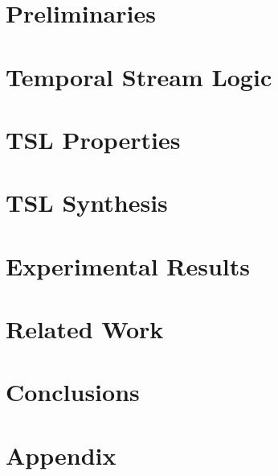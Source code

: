 \documentclass{llncs}
\begin{document}
\section{Preliminaries}
\label{sec:prelim}


\section{Temporal Stream Logic}
\label{sec:TSL}


\section{TSL Properties}
\label{sec:props}


\section{TSL Synthesis}
\label{sec:synth}


\section{Experimental Results}
\label{sec:eval}


\section{Related Work}
\label{sec:related}


\section{Conclusions}
\label{sec:conclusions}





\newpage

\appendix
\section{Appendix}

\end{document}
